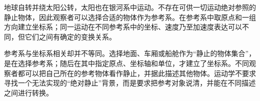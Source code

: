 {\newcommand{\KQuestionDH}{%
\begin{center}\begin{minipage}{.97\linewidth}\centering
\begin{tikzpicture}[>=Latex,scale=.9]

\coordinate (A) at (4,0);\coordinate (B) at (-2,2.4);\coordinate (C) at (2.4,2.4);
\draw[thick] (A)--(B) node[midway,below left]{$L$};
\draw[kguide] (B)--(5.1,2.4) (A)--(4,3.2) (A)--(C);
\draw[vector] (B)--(-.7,2.4) node[midway,above]{$v_1$};
\draw[vector] (A)--($(A)!.43!(C)$) node[left]{$v_2$};
\draw (B)++(-21.801:.85) arc(-21.801:0:.85);\node at (-.7,2.1){$\alpha$};
\draw (A)++(123.690:.65) arc(123.690:158.199:.65);\node at (3.23,.69){$\beta$};
\foreach \p/\pos in {A/below right,B/above left,C/above}\node[point,label=\pos:$\p$] at (\p){};

\end{tikzpicture}
\figcap{题图：A 为潜艇、B 为敌船初始位置，C 表示可能的相遇点；发射方向待定。}\label{ch04:ref:question-figure-2-85}
\end{minipage}\end{center}
}

\newcommand{\KQuestionDJ}{%
\begin{center}\begin{minipage}{.97\linewidth}\centering
\begin{tikzpicture}[>=Latex,scale=.9]

\draw[kguide] (0,0)--(4.8,0);
\foreach \x/\lab in {0/A,1.8/B,3.6/C}{\fill (\x,0) circle(1.5pt);\node[below] at (\x,0){$\lab$};}
\draw[vector] (0,0)--(.6,0);\node[above] at (.3,0){$u$};
\draw[vector] (1.8,0)--(1.8,1.2) node[above]{$2u$};
\draw[vector] (3.6,0)--(4.8,1.2) node[above]{$2\sqrt2u$};
\draw[<->] (0,-.65)--(1.8,-.65) node[midway,below]{$a$};
\draw[<->] (1.8,-.65)--(3.6,-.65) node[midway,below]{$a$};
\end{tikzpicture}
\figcap{题图：三船初始位置及对地速度，图中 A、B、C 等间距。}\label{ch04:ref:question-figure-2-87}
\end{minipage}\end{center}
}


地球自转并绕太阳公转，太阳也在银河系中运动。不存在可供一切运动绝对参照的静止物体，因此观察者可以选择合适的物体作为参考系。在参考系中取原点和一组方向建立坐标系；同一运动在不同参考系中的坐标、速度乃至加速度表达可以不同，但它们之间有确定的变换关系。

参考系与坐标系相关却并不等同。选择地面、车厢或船舱作为“静止的物体集合”，是在选择参考系；随后在其中指定原点、坐标轴和单位，才建立了坐标系。不同观察者都可以把自己所在的参考物体看作静止，并据此描述其他物体。运动学不要求寻找一个无法实现的“绝对静止”背景，而是要求把参考对象说清，并能在不同描述之间进行转换。

}
